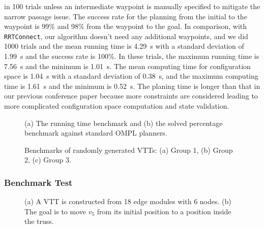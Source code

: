 \documentclass[journal]{IEEEtran}
\begin{document}
in 100 trials unless an intermediate waypoint is manually specified to
mitigate the narrow passage issue. The success rate for the planning
from the initial to the waypoint is 99\% and 98\% from the waypoint to
the goal. In comparison, with \texttt{RRTConnect}, our algorithm
doesn't need any additional waypoints, and we did 1000 trials and the
mean running time is \SI{4.29}{s} with a standard deviation of
\SI{1.99}{s} and the success rate is 100\%. In these trials, the
maximum running time is \SI{7.56}{s} and the minimum is
\SI{1.01}{s}. The mean computing time for configuration space is
\SI{1.04}{s} with a standard deviation of \SI{0.38}{s}, and the
maximum computing time is \SI{1.61}{s} and the minimum is
\SI{0.52}{s}. The planing time is longer than that in our previous
conference paper because more constraints are considered leading to
more complicated configuration space computation and state validation.

\begin{figure}[b]
  \centering
  \hfil
  \caption{(a) The running time benchmark and (b) the solved
    percentage benchmark against standard OMPL planners.}
  \label{fig:geometry-benchmark}
\end{figure}

\begin{figure*}[b]
  \centering
  \hfil
  \hfil
  \caption{Benchmarks of randomly generated VTTs: (a) Group 1, (b)
    Group 2, (c) Group 3.}
  \label{fig:random-benchmark}
\end{figure*}

\subsubsection{Benchmark Test}

\begin{figure}[t]
  \centering
  \hfil
  \caption{(a) A VTT is constructed from 18 edge modules with 6
    nodes. (b) The goal is to move $v_5$ from its initial position to
    a position inside the truss.}
\end{figure}
\end{document}
